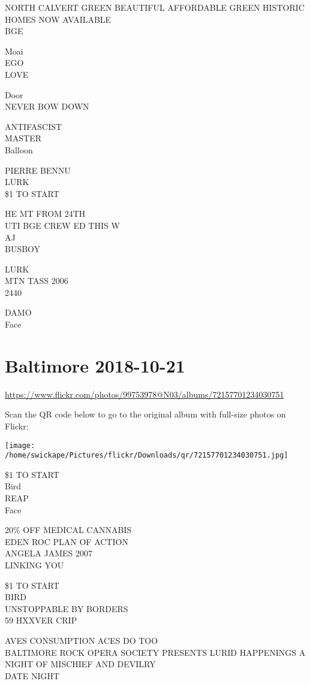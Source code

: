 \documentclass[10pt,letterpaper]{article}
\begin{document}
NORTH CALVERT GREEN BEAUTIFUL AFFORDABLE GREEN HISTORIC HOMES NOW AVAILABLE\\
BGE

Moai\\
EGO\\
LOVE

Door\\
NEVER BOW DOWN

ANTIFASCIST\\
MASTER\\
Balloon

PIERRE BENNU\\
LURK\\
\$1 TO START

HE MT FROM 24TH\\
UTI BGE CREW ED THIS W\\
AJ\\
BUSBOY

LURK\\
MTN TASS 2006\\
2440

DAMO\\
Face


\section*{Baltimore 2018-10-21}

\url{https://www.flickr.com/photos/99753978@N03/albums/72157701234030751}

Scan the QR code below to go to the original album with full-size photos on Flickr:

\texttt{[image: /home/swickape/Pictures/flickr/Downloads/qr/72157701234030751.jpg]}


\$1 TO START\\
Bird\\
REAP\\
Face

20\% OFF MEDICAL CANNABIS\\
EDEN ROC PLAN OF ACTION\\
ANGELA JAMES 2007\\
LINKING YOU

\$1 TO START\\
BIRD\\
UNSTOPPABLE BY BORDERS\\
59 HXXVER CRIP

AVES CONSUMPTION ACES DO TOO\\
BALTIMORE ROCK OPERA SOCIETY PRESENTS LURID HAPPENINGS A NIGHT OF MISCHIEF AND DEVILRY\\
DATE NIGHT
\end{document}
